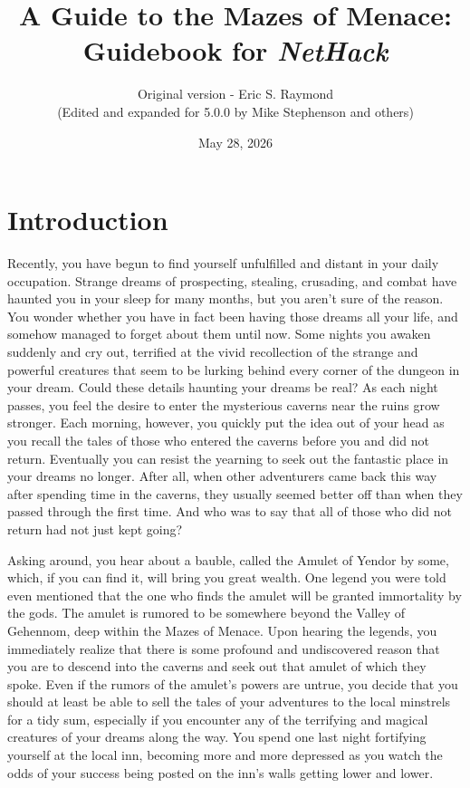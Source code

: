 \documentclass[titlepage]{article}
\begin{document}
%
%

\title{\LARGE A Guide to the Mazes of Menace:\\
\Large Guidebook for \textit{NetHack}}

\author{Original version - Eric S. Raymond\\
(Edited and expanded for 5.0.0 by Mike Stephenson and others)}
\date{May 28, 2026}

\maketitle

\section{Introduction}


Recently, you have begun to find yourself unfulfilled and distant
in your daily occupation.  Strange dreams of prospecting, stealing,
crusading, and combat have haunted you in your sleep for many months,
but you aren't sure of the reason.  You wonder whether you have in
fact been having those dreams all your life, and somehow managed to
forget about them until now.  Some nights you awaken suddenly
and cry out, terrified at the vivid recollection of the strange and
powerful creatures that seem to be lurking behind every corner of the
dungeon in your dream.  Could these details haunting your dreams be real?
As each night passes, you feel the desire to enter the mysterious caverns
near the ruins grow stronger.  Each morning, however, you quickly put
the idea out of your head as you recall the tales of those who entered
the caverns before you and did not return.  Eventually you can resist
the yearning to seek out the fantastic place in your dreams no longer.
After all, when other adventurers came back this way after spending time
in the caverns, they usually seemed better off than when they passed
through the first time.  And who was to say that all of those who did
not return had not just kept going?

Asking around, you hear about a bauble, called the Amulet of Yendor by some,
which, if you can find it, will bring you great wealth.  One legend you were
told even mentioned that the one who finds the amulet will be granted
immortality by the gods.  The amulet is rumored to be somewhere beyond the
Valley of Gehennom, deep within the Mazes of Menace.  Upon hearing the
legends, you immediately realize that there is some profound and
undiscovered reason that you are to descend into the caverns and seek
out that amulet of which they spoke.  Even if the rumors of the amulet's
powers are untrue, you decide that you should at least be able to sell the
tales of your adventures to the local minstrels for a tidy sum, especially
if you encounter any of the terrifying and magical creatures of
your dreams along the way.  You spend one last night fortifying yourself
at the local inn, becoming more and more depressed as you watch the odds
of your success being posted on the inn's walls getting lower and lower.
\end{document}

